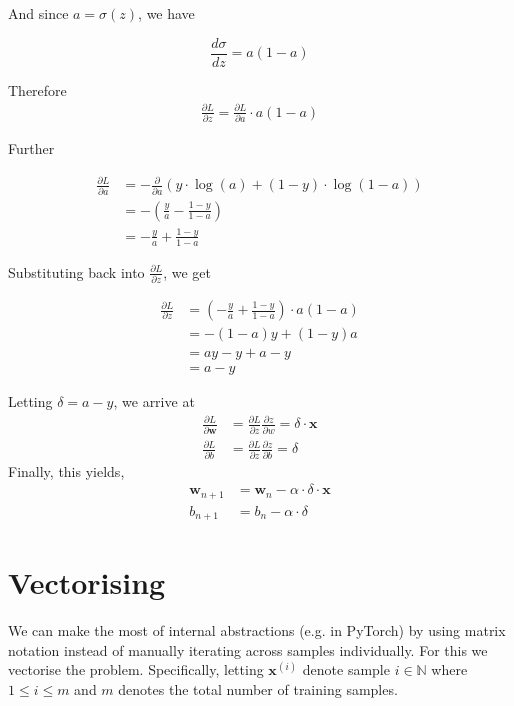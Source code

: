\documentclass[varwidth,border=2cm]{standalone}
\begin{document}
And since $a = \sigma(z)$, we have

\begin{equation}
\frac{d\sigma}{dz} = a(1 - a) \nonumber
\end{equation}

Therefore
\begin{align}
\frac{\partial L}{\partial z} = \frac{\partial L}{\partial a} \cdot a(1-a)
\end{align}

Further

\begin{align}
\frac{\partial L}{\partial a} &= - \frac{\partial}{\partial a} \left(y \cdot \log(a) + (1-y) \cdot \log(1-a)\right) \nonumber \\
 &= - \left( \frac{y}{a} - \frac{1-y}{1-a} \right) \nonumber \\
 &= -\frac{y}{a} + \frac{1-y}{1-a} \nonumber
\end{align}

Substituting back into $\frac{\partial L}{\partial z}$, we get

\begin{align}
\frac{\partial L}{\partial z} &= \left( -\frac{y}{a} + \frac{1-y}{1-a} \right) \cdot a(1-a) \\
 &= -(1-a)y + (1-y)a \nonumber \\
 &= ay - y + a - y \nonumber \\
 &= a - y \nonumber 
\end{align}

Letting $\delta = a -y$, we arrive at
\begin{align}
\frac{\partial L}{\partial \bm w} &= \frac{\partial L}{\partial z} \frac{\partial z}{\partial w} = \delta\cdot\bm x \\
\frac{\partial L}{\partial b} &= \frac{\partial L}{\partial z} \frac{\partial z}{\partial b} = \delta \nonumber
\end{align}
Finally, this yields,
\begin{align}
\bm w_{n+1} &= \bm w_n - \alpha \cdot \delta \cdot \bm x \\
b_{n+1} &= b_n - \alpha \cdot \delta \nonumber
\end{align}

\section{Vectorising}
We can make the most of internal abstractions (e.g. in PyTorch) by using matrix notation instead of manually iterating across samples individually. For this we vectorise the problem. Specifically, letting $\bm x ^{(i)}$ denote sample $i \in \mathbb{N}$ where $1 \le i \le m$ and $m$ denotes the total number of training samples.
\end{document}
